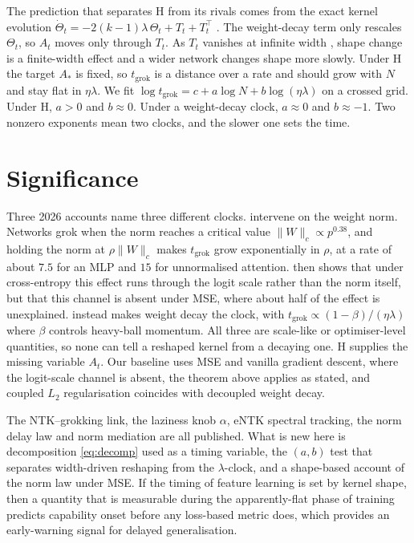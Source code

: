 \documentclass[a4paper,11pt]{article} %
\newcommand{\tgrok}{t_{\mathrm{grok}}}
\begin{document}
The prediction that separates H from its rivals comes from the exact kernel
evolution $\dot\Theta_t=-2(k-1)\lambda\,\Theta_t+T_t+T_t^\top$
\citep[Eq.~S5, arXiv v1]{lewkowycz2020l2}. The weight-decay term only rescales
$\Theta_t$, so $A_t$ moves only through $T_t$.
As $T_t$ vanishes at infinite width \citep{jacot2018ntk,lewkowycz2020l2},
shape change is a finite-width effect and a wider network changes shape more slowly. Under
H the target $A_*$ is fixed, so $\tgrok$ is a distance over a rate and should
grow with $N$ and stay flat in $\eta\lambda$. We fit $\log\tgrok=c+a\log N+b\log(\eta\lambda)$ on a crossed
grid. Under H, $a>0$ and $b\approx0$. Under a weight-decay clock, $a\approx0$
and $b\approx-1$. Two nonzero exponents mean two clocks, and the slower one sets the time.

\section{Significance}

Three 2026 accounts name three different clocks.
\citet{truong2026norm} intervene on the weight norm.
Networks grok when the norm reaches a critical value
$\lVert W\rVert_c\propto p^{0.38}$, and holding the norm at
$\rho\lVert W\rVert_c$ makes $\tgrok$ grow exponentially in $\rho$, at a rate of
about $7.5$ for an MLP and $15$ for unnormalised attention.
\citet{truong2026logit} then shows that under cross-entropy this effect runs
through the logit scale rather than the norm itself, but that this channel is
absent under MSE, where about half of the effect is unexplained.
\citet{kim2026clock} instead makes weight decay the clock, with
$\tgrok\propto(1-\beta)/(\eta\lambda)$ where $\beta$ controls heavy-ball momentum. All three are scale-like or
optimiser-level quantities, so none can tell a reshaped kernel from a decaying
one. H supplies the missing variable $A_t$. Our baseline uses MSE and vanilla
gradient descent, where the logit-scale channel is absent, the theorem above
applies as stated, and coupled $L_2$ regularisation coincides with decoupled
weight decay.

The NTK--grokking link, the laziness knob $\alpha$, eNTK spectral tracking,
the norm delay law and norm mediation are all published. What is new here is
decomposition \eqref{eq:decomp} used as a timing variable, the $(a,b)$ test
that separates width-driven reshaping from the $\lambda$-clock, and a shape-based
account of the norm law under MSE. If the timing of feature learning is set by kernel shape, then a quantity that is measurable during the apparently-flat phase of training predicts capability onset before any loss-based metric does, which provides an early-warning signal for delayed generalisation.
\end{document}
